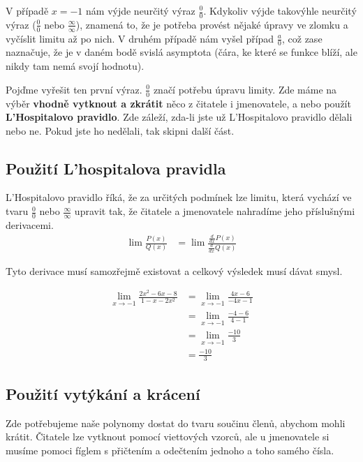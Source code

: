 \documentclass[]{article}
\begin{document}
	V případě $x=-1$ nám výjde neurčitý výraz $\frac{0}{0}$. Kdykoliv výjde takovýhle neurčitý výraz ($\frac{0}{0}$ nebo $\frac{\infty}{\infty}$), znamená to, že je potřeba provést nějaké úpravy ve zlomku a vyčíslit limitu až po nich. V druhém případě nám vyšel případ $\frac{a}{0}$, což zase naznačuje, že je v daném bodě svislá asymptota (čára, ke které se funkce blíží, ale nikdy tam nemá svojí hodnotu).
	
	Pojďme vyřešit ten první výraz. $\frac{0}{0}$ značí potřebu úpravu limity. Zde máme na výběr \textbf{vhodně vytknout a zkrátit} něco z čitatele i jmenovatele, a nebo použít \textbf{L'Hospitalovo pravidlo}. Zde záleží, zda-li jste už L'Hospitalovo pravidlo dělali nebo ne. Pokud jste ho nedělali, tak skipni další část.
	
	\subsection{Použití L'hospitalova pravidla}
	L'Hospitalovo pravidlo říká, že za určitých podmínek lze limitu, která vychází ve tvaru $\frac{0}{0}$ nebo $\frac{\infty}{\infty}$ upravit tak, že čitatele a jmenovatele nahradíme jeho příslušnými derivacemi.
	\begin{align*}
		\lim \frac{P(x)}{Q(x)} &= \lim \frac{\frac{d}{dx}P(x)}{\frac{d}{dx}Q(x)}
	\end{align*}
	
	Tyto derivace musí samozřejmě existovat a celkový výsledek musí dávat smysl.
	
	\begin{align*}
		\lim_{x \to -1} \frac{2x^2-6x-8}{1-x-2x^2} &= \lim_{x \to -1} \frac{4x-6}{-4x-1} \\
		&= \lim_{x \to -1} \frac{-4-6}{4-1} \\
		&= \lim_{x \to -1} \frac{-10}{3} \\
		&= \frac{-10}{3}
	\end{align*}
	
	\subsection{Použití vytýkání a krácení}
	Zde potřebujeme naše polynomy dostat do tvaru součinu členů, abychom mohli krátit. Čitatele lze vytknout pomocí viettových vzorců, ale u jmenovatele si musíme pomoci fíglem s přičtením a odečtením jednoho a toho samého čísla.
	
\end{document}
